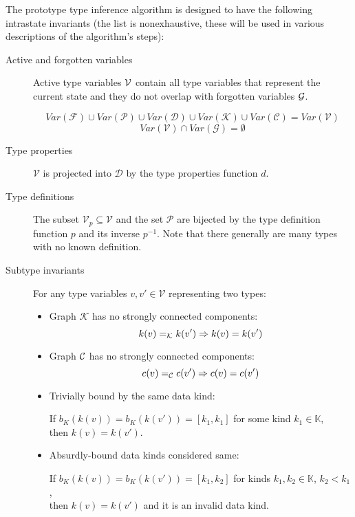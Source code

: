 The prototype type inference algorithm is designed to have the following intrastate invariants (the list is nonexhaustive, these will be used in various descriptions of the algorithm's steps):

\begin{description}
    \item[Active and forgotten variables]
    Active type variables $\mathcal V$ contain all type variables that represent the current state and they do not overlap with forgotten variables $\mathcal G$.

    $$Var(\mathcal{F}) \cup Var(\mathcal{P}) \cup Var(\mathcal{D}) \cup Var(\mathcal{K}) \cup Var(\mathcal{C}) = Var(\mathcal{V})$$ $$Var(\mathcal{V}) \cap Var(\mathcal{G}) = \emptyset$$

    \item[Type properties] $\mathcal{V}$ is projected into $\mathcal{D}$  by the type properties function $d$.

    \item[Type definitions] The subset $\mathcal{V}_p \subseteq \mathcal{V}$ and the set $\mathcal{P}$ are bijected by the type definition function $p$ and its inverse $p^{-1}$. Note that there generally are many types with no known definition.

    \item[Subtype invariants] For any type variables $v, v' \in \mathcal{V}$ representing two types:
        \begin{itemize}
            \item Graph $\mathcal{K}$ has no strongly connected components:
            $$k (v) =_{\mathcal{K}} k (v') \Rightarrow k (v) = k(v')$$

            \item Graph $\mathcal C$ has no strongly connected components:
            $$c (v) =_{\mathcal{C}} c (v') \Rightarrow c (v) = c(v')$$

            \item Trivially bound by the same data kind:

            If $b_K (k (v)) = b_K (k (v')) = [k_1, k_1]$ for some kind $k_1 \in \mathbb{K}$, \\
            then $k (v) = k (v')$.

            \item Absurdly-bound data kinds considered same:

            If $b_K (k (v)) = b_K (k (v')) = [k_1, k_2]$ for kinds $k_1, k_2 \in \mathbb{K}$, $k_2 < k_1$, \\
            then $k (v) = k (v')$ and it is an invalid data kind.


\end{itemize}
\end{description}
